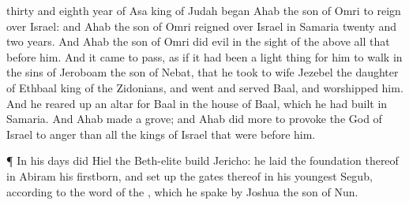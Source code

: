 {thirty and
eighth
year of
Asa
king of
Judah began
Ahab the
son of
Omri to
reign over
Israel: and
Ahab the
son of
Omri
reigned over
Israel in
Samaria
twenty and
two
years.
And
Ahab the
son of
Omri
did
evil in the
sight of the
{} above all that
{}
before him.
And it came to pass, as if it had been a light
thing for him to
walk in the
sins of
Jeroboam the
son of
Nebat, that he
took to
wife
Jezebel the
daughter of
Ethbaal
king of the
Zidonians, and
went and
served
Baal, and
worshipped him.
And he reared
up an
altar for
Baal in the
house of
Baal, which he had
built in
Samaria.
And
Ahab
made a
grove; and
Ahab
did
more to provoke the
{}
God of
Israel to
anger than all the
kings of
Israel that were
before him.
\par }{\PP {}¶ In his
days did
Hiel the
Beth-elite
build
Jericho: he laid the
foundation thereof in
Abiram his
firstborn, and set
up the
gates thereof in his
youngest
{}
Segub, according to the
word of the
{}, which he
spake
by
Joshua the
son of
Nun.

}
